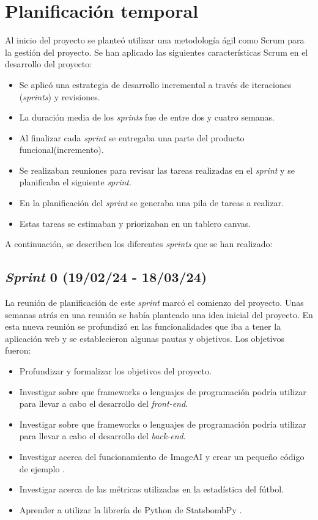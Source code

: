 \section{Planificación temporal}
Al inicio del proyecto se planteó utilizar una metodología ágil como Scrum para la gestión del proyecto. Se han aplicado las siguientes características Scrum en el desarrollo del proyecto:
\begin{itemize}
    \item Se aplicó una estrategia de desarrollo incremental a través de iteraciones (\textit{sprints}) y revisiones.
    \item La duración media de los \textit{sprints} fue de entre dos y cuatro semanas.
    \item Al finalizar cada \textit{sprint} se entregaba una parte del producto funcional(incremento).
    \item Se realizaban reuniones para revisar las tareas realizadas en el \textit{sprint} y se planificaba el siguiente \textit{sprint}.
    \item En la planificación del \textit{sprint} se generaba una pila de tareas a realizar.
    \item Estas tareas se estimaban y priorizaban en un tablero canvas.
\end{itemize}
A continuación, se describen los diferentes \textit{sprints} que se han realizado:

\subsection{\textbf{\textit{Sprint} 0 (19/02/24 - 18/03/24)}}
La reunión de planificación de este \textit{sprint} marcó el comienzo del proyecto. Unas semanas atrás en una reunión se había planteado una idea inicial del proyecto. En esta nueva reunión se profundizó en las funcionalidades que iba a tener la aplicación web y se establecieron algunas pautas y objetivos. Los objetivos fueron: \\
\begin{itemize}
    \item Profundizar y formalizar los objetivos del proyecto.
    \item Investigar sobre que frameworks o lenguajes de programación podría utilizar para llevar a cabo el desarrollo del \textit{front-end}.
    \item Investigar sobre que frameworks o lenguajes de programación podría utilizar para llevar a cabo el desarrollo del \textit{back-end}.
    \item Investigar acerca del funcionamiento de ImageAI y crear un pequeño código de ejemplo \cite{imageAI:latex}.
    \item Investigar acerca de las métricas utilizadas en la estadística del fútbol.
    \item Aprender a utilizar la librería de Python de StatsbombPy \cite{StatsBomb}.
\end{itemize}

